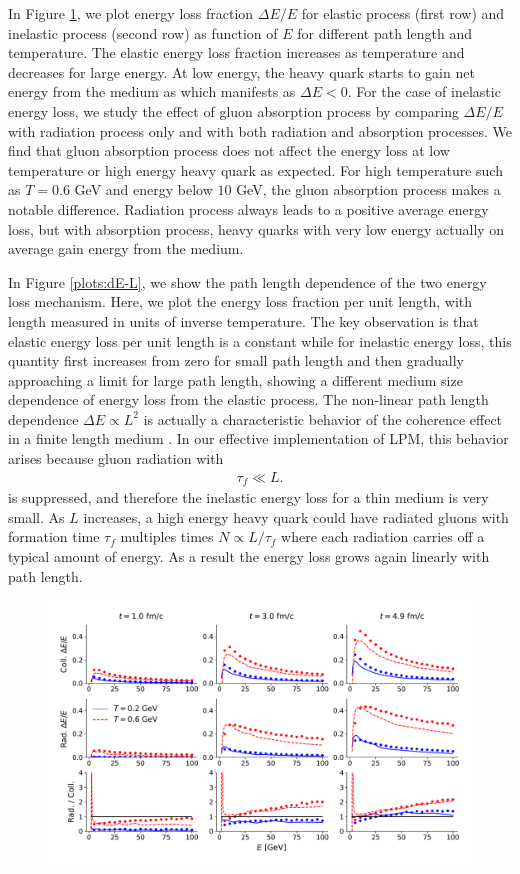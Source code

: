 \documentclass[aps, prc, reprint, amsmath, groupedaddress, nofootinbib]{revtex4-1}
\begin{document}
In Figure \ref{plots:dE-E}, we plot energy loss fraction $\Delta E/E$ for elastic process (first row) and inelastic process (second row) as function of $E$ for different path length and temperature.
The elastic energy loss fraction increases as temperature and decreases for large energy.
At low energy, the heavy quark starts to gain net energy from the medium as which manifests as $\Delta E < 0$.
For the case of inelastic energy loss, we study the effect of gluon absorption process by comparing $\Delta E/E$ with radiation process only and with both radiation and absorption processes.
We find that gluon absorption process does not affect the energy loss at low temperature or high energy heavy quark as expected.
For high temperature such as $T=0.6$ GeV and energy below $10$ GeV, the gluon absorption process makes a notable difference.
Radiation process always leads to a positive average energy loss, but with absorption process, heavy quarks with very low energy actually on average gain energy from the medium.

In Figure \ref{plots:dE-L}, we show the path length dependence of the two energy loss mechanism.
Here, we plot the energy loss fraction per unit length, with length measured in units of inverse temperature.
The key observation is that elastic energy loss per unit length is a constant while for inelastic energy loss, this quantity first increases from zero for small path length and then gradually approaching a limit for large path length, showing a different medium size dependence of energy loss from the elastic process.
The non-linear path length dependence $\Delta E \propto L^2$ is actually a characteristic behavior of the coherence effect in a finite length medium \cite{}. 
In our effective implementation of LPM, this behavior arises because gluon radiation with
\begin{eqnarray}
\tau_f \ll L.
\end{eqnarray}
is suppressed, and therefore the inelastic energy loss for a thin medium is very small.
As $L$ increases, a high energy heavy quark could have radiated gluons with formation time $\tau_f$ multiples times $N \propto L/\tau_f$ where each radiation carries off a typical amount of energy. 
As a result the energy loss grows again linearly with path length.


\begin{figure}
\includegraphics[width=\textwidth]{E_Eloss.pdf}
\caption{}\label{plots:dE-E}
\end{figure}
\end{document}
